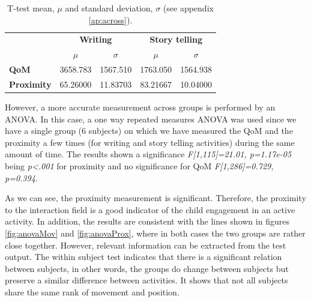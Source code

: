 \begin{table}[h!]
\centering
\begin{tabular}{l|l|l|l|l}
          & \multicolumn{2}{c|}{\textbf{Writing}}                               & \multicolumn{2}{c|}{\textbf{Story telling}}                        \\ \cline{2-5} 
          & \multicolumn{1}{c|}{$\mu$} & \multicolumn{1}{c|}{$\sigma$} & \multicolumn{1}{c|}{$\mu$} & \multicolumn{1}{c}{$\sigma$} \\ \hline
\textbf{QoM}  &          3658.783                  &         1567.510                      &              1763.050              &              1564.938                \\ \hline
\textbf{Proximity} &      65.26000                      &           11.83703                    &          83.21667                  &              10.04000                
\end{tabular}
\caption{T-test mean, $\mu$ and standard deviation, $\sigma$ (see appendix \ref{ap:across}).}
\label{tab:pvalues}
\end{table}


However, a more accurate measurement across groups is performed by an ANOVA. In this case, a one way repeated measures ANOVA was used since we have a single group (6 subjects) on which we have measured the QoM and the proximity a few times (for writing and story telling activities) during the same amount of time. The results shown a significance \textit{F[1,115]=21.01, p=1.17e-05} being \textit{p<.001} for proximity and no significance for QoM \textit{F[1,286]=0.729, p=0.394}.

As we can see, the proximity measurement is significant. Therefore, the proximity to the interaction field is a good indicator of the child engagement in an active activity. In addition, the results are consistent with the lines shown in figures \ref{fig:anovaMov} and \ref{fig:anovaProx}, where in both cases the two groups are rather close together. However, relevant information can be extracted from the test output. The within subject test indicates that there is a significant relation between subjects, in other words, the groups do change between subjects but preserve a similar difference between activities. It shows that not all subjects share the same rank of movement and position.

